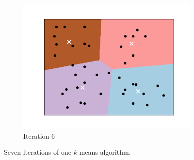 \documentclass[a4paper, 12pt]{article}
\numberwithin{equation}{section}
\numberwithin{figure}{section}
\theoremstyle{definition}
\begin{document}
\begin{figure}[ht]
\begin{subfigure}[b]{0.66\textwidth}
		\includegraphics[scale=0.4]{graphics/k_means_iter6.png}
		\vspace{-0.75em}
		\caption{Iteration 6}
	\end{subfigure}
	\caption{Seven iterations of one $k$-means algorithm.}
	\label{fig:4-means-iterations}
\end{figure}
\end{document}

